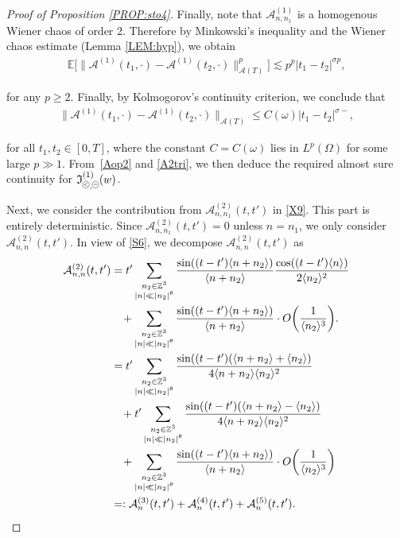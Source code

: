 \documentclass[%
11pt,  reqno]{amsart}
\newcommand{\pe}{\mathbin{\scaleobj{0.7}{\tikz \draw (0,0) node[shape=circle,draw,inner sep=0pt,minimum size=8.5pt] {\scriptsize  $=$};}}}
\newcommand{\pl}{\mathbin{\scaleobj{0.7}{\tikz \draw (0,0) node[shape=circle,draw,inner sep=0pt,minimum size=8.5pt] {\scriptsize $<$};}}}
\newcommand{\1}{\hspace{0.2mm}\text{I}\hspace{0.2mm}}
\newcommand{\noi}{\noindent}
\newcommand{\Z}{\mathbb{Z}}
\newcommand{\E}{\mathbb{E}}
\newcommand{\s}{\sigma}
\renewcommand{\o}{\omega}
\renewcommand{\O}{\Omega}
\newcommand{\les}{\lesssim}
\newcommand{\jb}[1]
{\langle #1 \rangle}
\newcommand{\If}{\mathfrak{I}}
\newcommand{\A}{\mathcal{A}}
\numberwithin{equation}{section}
\numberwithin{theorem}{section}
\begin{document}
\begin{proof}[Proof of Proposition \ref{PROP:sto4}]
Finally, note that 
 $\A^{(1)}_{n, n_1}$ is a homogenous Wiener chaos of order 2.
Therefore by Minkowski's inequality and the Wiener chaos estimate  (Lemma \ref{LEM:hyp}), we obtain 
 \begin{align*}
\E\big[\|\A^{(1)} (t_1, \cdot)-\A^{(1)} (t_2, \cdot)\|_{\A(T)}^p\big] \les 
p^p |t_1-t_2|^{\s p },
\end{align*}

 \noi
for any $p \geq 2$.
 Finally, by Kolmogorov's continuity criterion, 
 we conclude that 
 \begin{align}
  \|\A^{(1)} (t_1, \cdot)-\A^{(1)} (t_2, \cdot)\|_{\A(T)} \le C(\omega) 
 |t_1-t_2|^{\s-},  
\label{A2tri}
 \end{align}
 
 \noi
 for all $t_1,t_2\in[0,T]$,  where the constant $C= C(\o)$ lies in $L^p(\O)$ for some large $p\gg 1$. 
  From~\eqref{Aop2} 
and \eqref{A2tri}, 
we then deduce the required almost sure continuity for $\If_{\pl, \pe}^{(1)}(w)$.


Next, we consider the contribution from 
$ \A^{(2)}_{n, n_1} (t, t')$ in \eqref{X9}.  This part is entirely deterministic.
Since 
$ \A^{(2)}_{n, n_1} (t, t') = 0$ unless $n = n_1$, 
we only consider $ \A^{(2)}_{n, n} (t, t')$.
In view of \eqref{S6}, we decompose $ \A^{(2)}_{n, n} (t, t')$ as
 \begin{align}
 \A^{(2)}_{n, n} (t, t')
&  =  t'\sum_{\substack{n_2 \in \Z^3 \\ |n| \ll |n_2|^\theta}}
 \frac{\sin ((t - t') \jb{n + n_2 })}{\jb{ n + n_2} } 
   \frac{\cos((t - t')\jb{n}) }{2 \jb{n_2}^2}  \notag\\
& \hphantom{X}
+ \sum_{\substack{n_2 \in \Z^3 \\ |n| \ll |n_2|^\theta}}
 \frac{\sin ((t - t') \jb{n + n_2 })}{\jb{ n + n_2} } 
 \cdot    O\bigg(\frac{1}{\jb{n_2}^3 }\bigg).
\notag   \\
& = t'    \sum_{\substack{n_2 \in \Z^3 \\ |n| \ll |n_2|^\theta}}
\frac{\sin ((t - t')( \jb{n + n_2 }+ \jb{n_2})}{4\jb{ n + n_2} \jb{n_2}^2}  \notag\\
& \hphantom{X}
+ t'    \sum_{\substack{n_2 \in \Z^3 \\ |n| \ll |n_2|^\theta}}
 \frac{\sin ((t - t')( \jb{n + n_2 }- \jb{n_2})}{4\jb{ n + n_2} \jb{n_2}^2}  \notag\\
& \hphantom{X}
+ \sum_{\substack{n_2 \in \Z^3 \\ |n| \ll |n_2|^\theta}}
 \frac{\sin ((t - t') \jb{n + n_2 })}{\jb{ n + n_2} } 
\cdot    O\bigg(\frac{1}{\jb{n_2}^3 }\bigg)\notag\\
& = : 
 \A^{(3)}_{n} (t, t')
 +  \A^{(4)}_{n} (t, t')
 +  \A^{(5)}_{n} (t, t').
 \label{A4a}
\end{align}



\end{proof}
\end{document}
